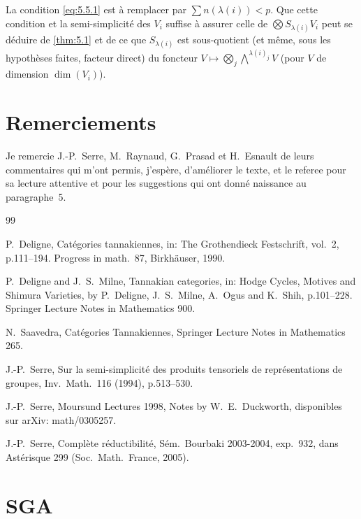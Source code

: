 \documentclass[11pt,a4paper]{article}
\theoremstyle{plain}
\theoremstyle{definition}
\begin{document}
La condition \eqref{eq:5.5.1} est \`a remplacer par $\sum n(\lambda(i)) < p$. Que cette condition et la semi-simplicit\'e des $V_i$ suffise \`a assurer celle de $\bigotimes S_{\lambda(i)} V_i$ peut se d\'eduire de \ref{thm:5.1} et de ce que $S_{\lambda(i)}$ est sous-quotient (et m\^eme, sous les hypoth\`eses faites, facteur direct) du foncteur $V \mapsto \bigotimes_j \bigwedge^{\lambda(i)_j} V$ (pour $V$ de dimension $\dim(V_i)$).

\section*{Remerciements}

Je remercie J.-P.\ Serre, M.\ Raynaud, G.\ Prasad et H.\ Esnault de leurs commentaires qui m'ont permis, j'esp\`ere, d'am\'eliorer le texte, et le referee pour sa lecture attentive et pour les suggestions qui ont donn\'e naissance au paragraphe~5.

\begin{thebibliography}{99}

P.\ Deligne, Cat\'egories tannakiennes, in: The Grothendieck Festschrift, vol.~2, p.111--194. Progress in math.~87, Birkh\"auser, 1990.

P.\ Deligne and J.\ S.\ Milne, Tannakian categories, in: Hodge Cycles, Motives and Shimura Varieties, by P.\ Deligne, J.\ S.\ Milne, A.\ Ogus and K.\ Shih, p.101--228. Springer Lecture Notes in Mathematics 900.

N.\ Saavedra, Cat\'egories Tannakiennes, Springer Lecture Notes in Mathematics 265.

J.-P.\ Serre, Sur la semi-simplicit\'e des produits tensoriels de repr\'esentations de groupes, Inv.\ Math.\ 116 (1994), p.513--530.

J.-P.\ Serre, Moursund Lectures 1998, Notes by W.\ E.\ Duckworth, disponibles sur arXiv: math/0305257.

J.-P.\ Serre, Compl\`ete r\'eductibilit\'e, S\'em.\ Bourbaki 2003-2004, exp.~932, dans Ast\'erisque 299 (Soc.\ Math.\ France, 2005).

\end{thebibliography}

\section*{SGA}
\end{document}
